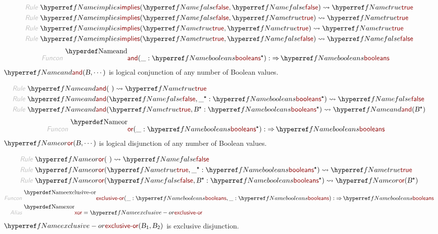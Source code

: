\begin{align*}
  \KEY{Rule} ~ 
    & \NAMEREF{implies}
        ( \NAMEREF{false},   
          \NAMEREF{false} ) \leadsto
        \NAMEREF{true}
\\
  \KEY{Rule} ~ 
    & \NAMEREF{implies}
        ( \NAMEREF{false},   
          \NAMEREF{true} ) \leadsto
        \NAMEREF{true}
\\
  \KEY{Rule} ~ 
    & \NAMEREF{implies}
        ( \NAMEREF{true},   
          \NAMEREF{true} ) \leadsto
        \NAMEREF{true}
\\
  \KEY{Rule} ~ 
    & \NAMEREF{implies}
        ( \NAMEREF{true},   
          \NAMEREF{false} ) \leadsto
        \NAMEREF{false}
\end{align*}
\begin{align*}
  \KEY{Funcon} ~ 
  & \NAMEDECL{and}(\_ : \NAMEREF{booleans}\STAR) :  \TO \NAMEREF{booleans}
\end{align*}
$\SHADE{\NAMEREF{and}
           ( \VAR{B},   
             \cdots )}$ is logical conjunction of any number of Boolean values.

\begin{align*}
  \KEY{Rule} ~ 
    & \NAMEREF{and}
        (  ~  ) \leadsto
        \NAMEREF{true}
\\
  \KEY{Rule} ~ 
    & \NAMEREF{and}
        ( \NAMEREF{false},   
          \_\STAR : \NAMEREF{booleans}\STAR ) \leadsto
        \NAMEREF{false}
\\
  \KEY{Rule} ~ 
    & \NAMEREF{and}
        ( \NAMEREF{true},   
          \VAR{B}\STAR : \NAMEREF{booleans}\STAR ) \leadsto
        \NAMEREF{and}
          ( \VAR{B}\STAR )
\end{align*}
\begin{align*}
  \KEY{Funcon} ~ 
  & \NAMEDECL{or}(\_ : \NAMEREF{booleans}\STAR) :  \TO \NAMEREF{booleans}
\end{align*}
$\SHADE{\NAMEREF{or}
           ( \VAR{B},   
             \cdots )}$ is logical disjunction of any number of Boolean values.

\begin{align*}
  \KEY{Rule} ~ 
    & \NAMEREF{or}
        (  ~  ) \leadsto
        \NAMEREF{false}
\\
  \KEY{Rule} ~ 
    & \NAMEREF{or}
        ( \NAMEREF{true},   
          \_\STAR : \NAMEREF{booleans}\STAR ) \leadsto
        \NAMEREF{true}
\\
  \KEY{Rule} ~ 
    & \NAMEREF{or}
        ( \NAMEREF{false},   
          \VAR{B}\STAR : \NAMEREF{booleans}\STAR ) \leadsto
        \NAMEREF{or}
          ( \VAR{B}\STAR )
\end{align*}
\begin{align*}
  \KEY{Funcon} ~ 
  & \NAMEDECL{exclusive-or}(\_ : \NAMEREF{booleans}, \_ : \NAMEREF{booleans}) :  \TO \NAMEREF{booleans}
\\
  \KEY{Alias} ~ 
  & \NAMEDECL{xor} = \NAMEREF{exclusive-or}
\end{align*}
$\SHADE{\NAMEREF{exclusive-or}
           ( \VAR{B}\SUB{1},   
             \VAR{B}\SUB{2} )}$ is exclusive disjunction.

